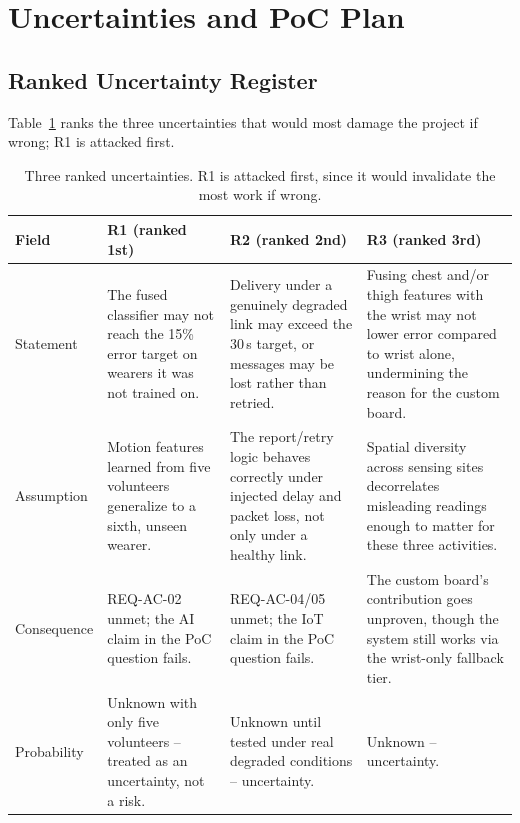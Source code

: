 \section{Uncertainties and PoC Plan}
\label{sec:poc}

\subsection{Ranked Uncertainty Register}

Table~\ref{tab:uncertainties} ranks the three uncertainties that
would most damage the project if wrong; R1 is attacked first.

\begin{table}[t]
\centering
\footnotesize
\setlength{\tabcolsep}{3pt}
\caption{Three ranked uncertainties. R1 is attacked first, since it would invalidate the most work if wrong.}
\label{tab:uncertainties}
\begin{tabular}{p{1.9cm}p{4.95cm}p{4.95cm}p{4.95cm}}
\toprule
\textbf{Field} & \textbf{R1 (ranked 1st)} & \textbf{R2 (ranked 2nd)} & \textbf{R3 (ranked 3rd)} \\
\midrule
Statement &
The fused classifier may not reach the 15\% error target on
wearers it was not trained on. &
Delivery under a genuinely degraded link may exceed the 30\,s
target, or messages may be lost rather than retried. &
Fusing chest and/or thigh features with the wrist may not lower
error compared to wrist alone, undermining the reason for the
custom board. \\[0.6em]

Assumption &
Motion features learned from five volunteers generalize to a
sixth, unseen wearer. &
The report/retry logic behaves correctly under injected delay
and packet loss, not only under a healthy link. &
Spatial diversity across sensing sites decorrelates misleading
readings enough to matter for these three activities. \\[0.6em]

Consequence &
REQ-AC-02 unmet; the AI claim in the PoC question fails. &
REQ-AC-04/05 unmet; the IoT claim in the PoC question fails. &
The custom board's contribution goes unproven, though the
system still works via the wrist-only fallback tier. \\[0.6em]

Probability &
Unknown with only five volunteers -- treated as an uncertainty,
not a risk. &
Unknown until tested under real degraded conditions --
uncertainty. &
Unknown -- uncertainty. \\[0.6em]


\end{tabular}
\end{table}
